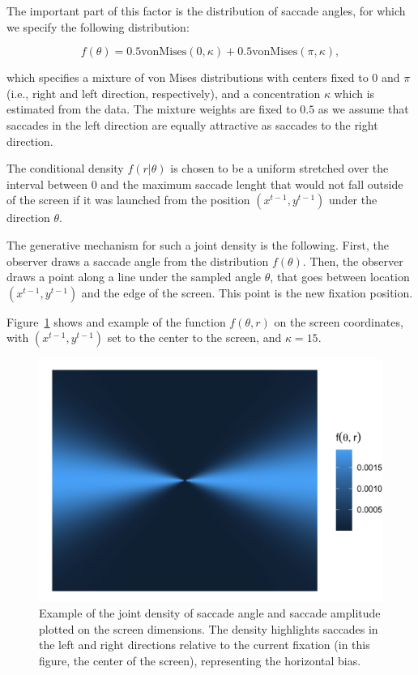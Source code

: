 \documentclass{article}
\begin{document}
The important part of this factor is the distribution of saccade angles, for which we specify the following distribution:

\begin{equation}
    f(\theta) = 0.5 \text{vonMises}(0, \kappa) + 0.5 \text{vonMises}(\pi, \kappa),
\end{equation}

which specifies a mixture of von Mises distributions with centers fixed to 0 and $\pi$ (i.e., right and left direction, respectively), and a concentration $\kappa$ which is estimated from the data. The mixture weights are fixed to $0.5$ as we assume that saccades in the left direction are equally attractive as saccades to the right direction.

The conditional density $f(r | \theta)$ is chosen to be a uniform stretched over the interval between 0 and the maximum saccade lenght that would not fall outside of the screen if it was launched from the position $(x^{t-1}, y^{t-1})$ under the direction $\theta$.

The generative mechanism for such a joint density is the following. First, the observer draws a saccade angle from the distribution $f(\theta)$. Then, the observer draws a point along a line under the sampled angle $\theta$, that goes between location $(x^{t-1}, y^{t-1})$ and the edge of the screen. This point is the new fixation position.

Figure~\ref{fig:horizontal_example} shows and example of the function $f(\theta, r)$ on the screen coordinates, with $(x^{t-1}, y^{t-1})$ set to the center to the screen, and $\kappa = 15$.

\begin{figure}
    \centering
    \includegraphics[width=\linewidth]{figures/horizontal_example.jpg}
    \caption{Example of the joint density of saccade angle and saccade amplitude plotted on the screen dimensions. The density highlights saccades in the left and right directions relative to the current fixation (in this figure, the center of the screen), representing the horizontal bias.}
    \label{fig:horizontal_example}
\end{figure}
\end{document}
